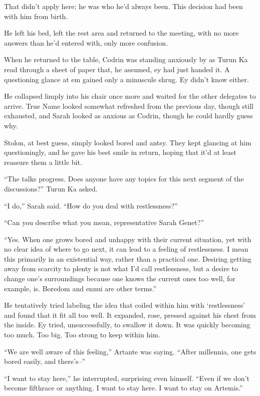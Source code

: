 That didn't apply here; he was who he'd always been. This decision had been with him from birth.

He left his bed, left the rest area and returned to the meeting, with no more answers than he'd entered with, only more confusion.

When he returned to the table, Codrin was standing anxiously by as Turun Ka read through a sheet of paper that, he assumed, ey had just handed it. A questioning glance at em gained only a minuscule shrug. Ey didn't know either.

He collapsed limply into his chair once more and waited for the other delegates to arrive. True Name looked somewhat refreshed from the previous day, though still exhausted, and Sarah looked as anxious as Codrin, though he could hardly guess why.

Stolon, at best guess, simply looked bored and antsy. They kept glancing at him questioningly, and he gave his best smile in return, hoping that it'd at least reassure them a little bit.

``The talks progress. Does anyone have any topics for this next segment of the discussions?'' Turun Ka asked.

``I do,'' Sarah said. ``How do you deal with restlessness?''

``Can you describe what you mean, representative Sarah Genet?''

``Yes. When one grows bored and unhappy with their current situation, yet with no clear idea of where to go next, it can lead to a feeling of restlessness. I mean this primarily in an existential way, rather than a practical one. Desiring getting away from scarcity to plenty is not what I'd call restlessness, but a desire to change one's surroundings because one knows the current ones too well, for example, is. Boredom and ennui are other terms.''

He tentatively tried labeling the idea that coiled within him with `restlessness' and found that it fit all too well. It expanded, rose, pressed against his chest from the inside. Ey tried, unsuccessfully, to swallow it down. It was quickly becoming too much. Too big. Too strong to keep within him.

``We are well aware of this feeling,'' Artante was saying. ``After millennia, one gets bored easily, and there's--''

``I want to stay here,'' he interrupted, surprising even himself. ``Even if we don't become fifthrace or anything. I want to stay here. I want to stay on Artemis.''

